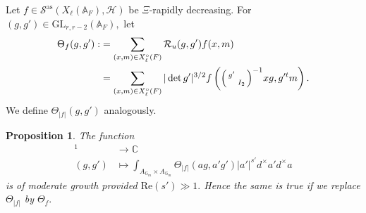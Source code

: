\documentclass[12pt]{amsart}
\newtheorem{prop}[thm]{Proposition}
\theoremstyle{remark}
\numberwithin{equation}{section}
\newcommand{\A}{\mathbb{A}}
\newcommand{\GL}{\mathrm{GL}}
\newcommand{\lto}{\longrightarrow}
\newcommand{\CC}{\mathbb{C}}
\newcommand{\GG}{\mathbb{G}}
\theoremstyle{definition}
\newenvironment{psmatrix}
  {\left(\begin{smallmatrix}}
  {\end{smallmatrix}\right)}
\numberwithin{equation}{subsection}
\begin{document}
Let $f \in \mathcal{S}^{\mathrm{as}}(X_{\ell}(\A_F),\mathcal{H})$ be $\Xi$-rapidly decreasing. For $(g,g') \in \GL_{r,r-2}(\A_F),$ let 
\begin{align} \label{Thetaf2} \begin{split}
    \Theta_f(g,g'):&=\sum_{(x,m) \in X_\ell^\circ(F)}\mathcal{R}_u(g,g')f(x,m)\\&=\sum_{(x,m) \in X_\ell^\circ(F) }|\det g'|^{3/2}f\left( \begin{psmatrix} g' & \\ & I_2\end{psmatrix}^{-1}xg,g'^{t}m\right). \end{split}
\end{align}
We define $\Theta_{|f|}(g,g')$ analogously.  


\begin{prop} \label{prop:mod:growth}
The function
\begin{align*}
[\GL_{r,r-2}]^1 &\lto \CC\\
    (g,g') &\longmapsto \int_{A_{\GG_m} \times A_{\GG_m}}\Theta_{|f|}(ag,a'g')|a'|^{s'}d^\times a' d^\times a 
\end{align*}
is of moderate growth provided $\mathrm{Re}(s') \gg 1.$  Hence the same is true if we replace $\Theta_{|f|}$ by $\Theta_{f}.$
\end{prop}
\end{document}
